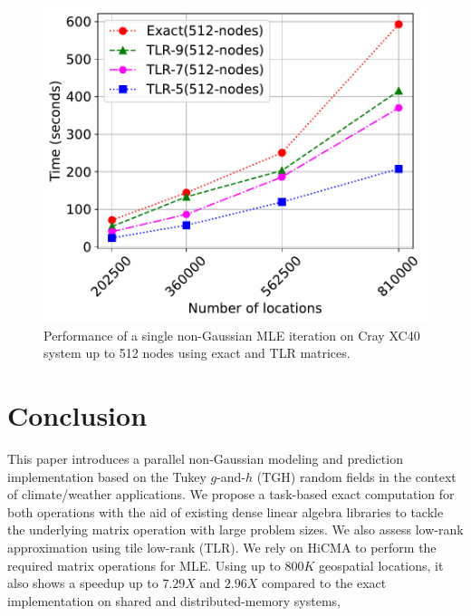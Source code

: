 \documentclass[conference]{IEEEtran}
\begin{document}
\begin{figure}[h]
\centering
\includegraphics[width=0.65\linewidth]{./figures/shaheen-performance.pdf}
  \caption{Performance of a single non-Gaussian MLE iteration on
Cray XC40 system up to 512 nodes using exact and TLR matrices.
}
  \label{fig:crayxc40}
\end{figure}

\section{Conclusion}
This paper introduces a parallel non-Gaussian modeling and
prediction implementation based on the Tukey $g$-and-$h$ (TGH)
random fields in the context of climate/weather applications. 
We propose a task-based exact computation for both operations
with the aid of existing dense linear algebra libraries to tackle the underlying matrix operation with large problem sizes. We also
assess low-rank approximation using tile low-rank (TLR). We rely on HiCMA to perform the required
matrix operations for MLE. Using up to $800K$ geospatial locations, it also shows a speedup up to 
$7.29X$ and $2.96X$ compared to the exact implementation on shared and distributed-memory systems,






\end{document}
